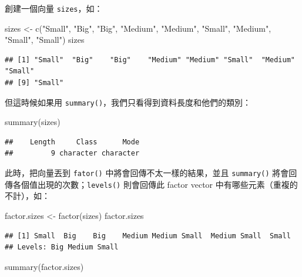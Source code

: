 \documentclass[
]{book}
\newenvironment{Shaded}{\begin{snugshade}}{\end{snugshade}}
\newcommand{\FunctionTok}[1]{\textcolor[rgb]{0.00,0.00,0.00}{#1}}
\newcommand{\NormalTok}[1]{#1}
\newcommand{\OtherTok}[1]{\textcolor[rgb]{0.56,0.35,0.01}{#1}}
\newcommand{\StringTok}[1]{\textcolor[rgb]{0.31,0.60,0.02}{#1}}
\theoremstyle{definition}
\theoremstyle{remark}
\begin{document}
創建一個向量 \texttt{sizes}，如：

\begin{Shaded}
\begin{Highlighting}[]
\NormalTok{sizes }\OtherTok{\textless{}{-}} \FunctionTok{c}\NormalTok{(}\StringTok{"Small"}\NormalTok{, }\StringTok{"Big"}\NormalTok{, }\StringTok{"Big"}\NormalTok{, }\StringTok{"Medium"}\NormalTok{, }\StringTok{"Medium"}\NormalTok{, }\StringTok{"Small"}\NormalTok{, }\StringTok{"Medium"}\NormalTok{, }\StringTok{"Small"}\NormalTok{, }\StringTok{"Small"}\NormalTok{)}
\NormalTok{sizes}
\end{Highlighting}
\end{Shaded}

\begin{verbatim}
## [1] "Small"  "Big"    "Big"    "Medium" "Medium" "Small"  "Medium" "Small" 
## [9] "Small"
\end{verbatim}

但這時候如果用 \texttt{summary()}，我們只看得到資料長度和他們的類別：

\begin{Shaded}
\begin{Highlighting}[]
\FunctionTok{summary}\NormalTok{(sizes)}
\end{Highlighting}
\end{Shaded}

\begin{verbatim}
##    Length     Class      Mode 
##         9 character character
\end{verbatim}

此時，把向量丟到 \texttt{fator()} 中將會回傳不太一樣的結果，並且 \texttt{summary()} 將會回傳各個值出現的次數；\texttt{levels()} 則會回傳此 factor vector 中有哪些元素（重複的不計），如：

\begin{Shaded}
\begin{Highlighting}[]
\NormalTok{factor.sizes }\OtherTok{\textless{}{-}} \FunctionTok{factor}\NormalTok{(sizes)}
\NormalTok{factor.sizes}
\end{Highlighting}
\end{Shaded}

\begin{verbatim}
## [1] Small  Big    Big    Medium Medium Small  Medium Small  Small 
## Levels: Big Medium Small
\end{verbatim}

\begin{Shaded}
\begin{Highlighting}[]
\FunctionTok{summary}\NormalTok{(factor.sizes)}
\end{Highlighting}
\end{Shaded}
\end{document}
